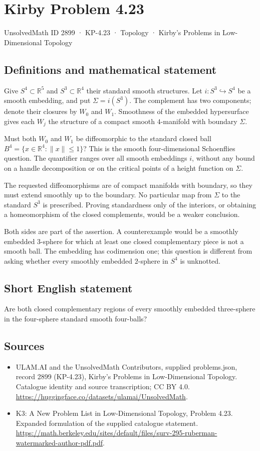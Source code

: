 \documentclass[11pt,a4paper]{article}
\begin{document}
\section*{Kirby Problem 4.23}\label{2899}
{\small UnsolvedMath ID 2899 · KP-4.23 · Topology · Kirby's Problems in Low-Dimensional Topology}
\subsection{Definitions and mathematical statement}
Give $S^4\subset\mathbb R^5$ and $S^3\subset\mathbb R^4$ their standard
smooth structures. Let $i:S^3\hookrightarrow S^4$ be a smooth embedding,
and put $\Sigma=i(S^3)$. The complement has two components; denote
their closures by $W_0$ and $W_1$. Smoothness of the embedded
hypersurface gives each $W_j$ the structure of a compact smooth
$4$-manifold with boundary $\Sigma$.

Must both $W_0$ and $W_1$ be diffeomorphic to the standard closed
ball $B^4=\{x\in\mathbb R^4:\|x\|\le1\}$? This is the smooth
four-dimensional Schoenflies question. The quantifier ranges over all
smooth embeddings $i$, without any bound on a handle decomposition
or on the critical points of a height function on $\Sigma$.

The requested diffeomorphisms are of compact manifolds with boundary,
so they must extend smoothly up to the boundary. No particular map
from $\Sigma$ to the standard $S^3$ is prescribed. Proving standardness
only of the interiors, or obtaining a homeomorphism of the closed
complements, would be a weaker conclusion.

Both sides are part of the assertion. A counterexample would be a
smoothly embedded $3$-sphere for which at least one closed complementary
piece is not a smooth ball. The embedding has codimension one; this
question is different from asking whether every smoothly embedded
$2$-sphere in $S^4$ is unknotted.
\subsection{Short English statement}
Are both closed complementary regions of every smoothly embedded three-sphere in the four-sphere standard smooth four-balls?
\subsection{Sources}
\begin{itemize}
\item[S1] ULAM.AI and the UnsolvedMath Contributors, supplied problems.json, record 2899 (KP-4.23), Kirby's Problems in Low-Dimensional Topology. Catalogue identity and source transcription; CC BY 4.0.
\url{https://huggingface.co/datasets/ulamai/UnsolvedMath}.
\item[S2] K3: A New Problem List in Low-Dimensional Topology, Problem 4.23. Expanded formulation of the supplied catalogue statement.
\url{https://math.berkeley.edu/sites/default/files/surv-295-ruberman-watermarked-author-pdf.pdf}.
\end{itemize}
\end{document}
